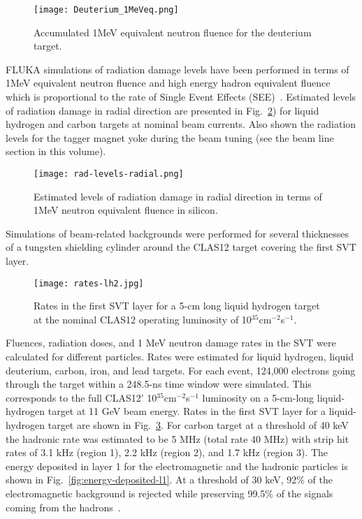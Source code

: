 \begin{figure}[hbt] 
\centering 
\texttt{[image: Deuterium\_1MeVeq.png]}
\caption{Accumulated 1MeV equivalent neutron fluence for the deuterium target.}
\label{fig:fluka2}
\end{figure}

FLUKA simulations of radiation damage levels have been performed in terms of 1MeV equivalent neutron fluence and high energy hadron equivalent fluence which is proportional to the rate of Single Event Effects (SEE)~\cite{FLUKA3}. Estimated levels of radiation damage in radial direction are presented in Fig.~\ref{fig:rad-levels-radial}) for liquid hydrogen and carbon targets at nominal beam currents. Also shown the radiation levels for the tagger magnet yoke during the beam tuning (see the beam line section in this volume).

\begin{figure}[hbt] 
\centering 
\texttt{[image: rad-levels-radial.png]}
\caption{Estimated levels of radiation damage in radial direction in terms of 1MeV neutron equivalent fluence in silicon.}
\label{fig:rad-levels-radial}
\end{figure}

Simulations of beam-related backgrounds were performed for several thicknesses of a tungsten shielding cylinder around the CLAS12 target covering the first SVT layer. 
 
\begin{figure}[hbt] 
\centering 
\texttt{[image: rates-lh2.jpg]}
\caption{Rates in the first SVT layer for a 5-cm long liquid hydrogen target at the nominal CLAS12 operating luminosity of 10$^{35}$cm$^{-2}$s$^{-1}$.}
\label{fig:rates-lh2}
\end{figure}

Fluences, radiation doses, and 1 MeV neutron damage rates in the SVT were calculated for different particles. Rates were estimated for liquid hydrogen, liquid deuterium, carbon, iron, and lead targets. For each event, 124,000 electrons going through the target within a 248.5-ns time window were simulated. This corresponds to the full CLAS12' 10$^{35}$cm$^{-2}$s$^{-1}$ luminosity on a 5-cm-long liquid-hydrogen target at 11 GeV beam energy. Rates in the first SVT layer for a liquid-hydrogen target are shown in Fig.~\ref{fig:rates-lh2}. For carbon target at a threshold of 40 keV the hadronic rate was estimated to be 5 MHz (total rate 40 MHz) with strip hit rates of 3.1 kHz (region 1), 2.2 kHz (region 2), and 1.7 kHz (region 3). The energy deposited in layer 1 for the electromagnetic and the hadronic particles is shown in Fig.~\ref{fig:energy-deposited-l1}. At a threshold of 30 keV, 92$\%$ of the electromagnetic background is rejected while preserving  99.5$\%$ of the signals coming from the hadrons~\cite{TDRSVT}.

